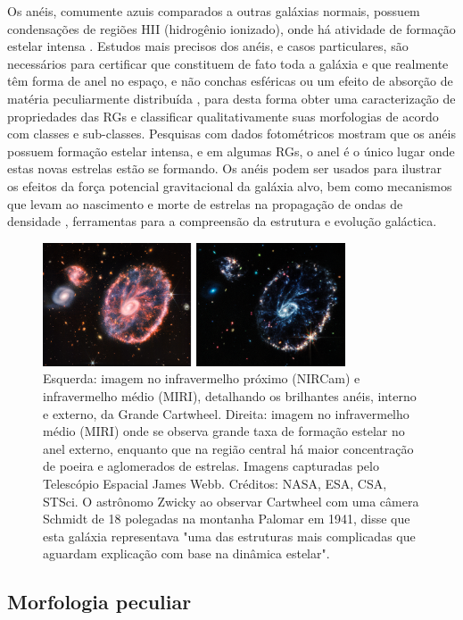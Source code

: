 Os anéis, comumente azuis comparados a outras galáxias normais, possuem condensações de regiões HII (hidrogênio ionizado), onde há atividade de formação estelar intensa \cite{2011fogarty}. Estudos mais precisos dos anéis, e casos particulares, são necessários para certificar que constituem de fato toda a galáxia e que realmente têm forma de anel no espaço, e não conchas esféricas ou um efeito de absorção de matéria peculiarmente distribuída \cite{Agosto1970}, para desta forma obter uma caracterização de propriedades das RGs e classificar qualitativamente suas morfologias de acordo com classes e sub-classes. Pesquisas com dados fotométricos \cite{2024MNRAS.527.2816M, 1999A&A...351..860M} mostram que os anéis possuem formação estelar intensa, e em algumas RGs, o anel é o único lugar onde estas novas estrelas estão se formando. Os anéis podem ser usados para ilustrar os efeitos da força potencial gravitacional da galáxia alvo, bem como mecanismos que levam ao nascimento e morte de estrelas na propagação de ondas de densidade \cite{Appleton96}, ferramentas para a compreensão da estrutura e evolução galáctica.

\begin{figure}
  \centering 
  \includegraphics[width=0.8\textwidth]{Imagens/Cartwheel03.PNG} 
  \caption[Gálaxia Cartwheel.]{Esquerda: imagem no infravermelho próximo (NIRCam) e infravermelho médio (MIRI), detalhando os brilhantes anéis, interno e externo, da Grande Cartwheel. Direita: imagem no infravermelho médio (MIRI) onde se observa grande taxa de formação estelar no anel externo, enquanto que na região central há maior concentração de poeira e aglomerados de estrelas. Imagens capturadas pelo Telescópio Espacial James Webb. Créditos: NASA, ESA, CSA, STSci. O astrônomo Zwicky ao observar Cartwheel com uma câmera Schmidt de 18 polegadas na montanha Palomar em 1941, disse que esta galáxia representava "uma das estruturas mais complicadas que aguardam explicação com base na dinâmica estelar".}
  \label{fig:cartwheel} 
\end{figure}

\subsection{Morfologia peculiar}

